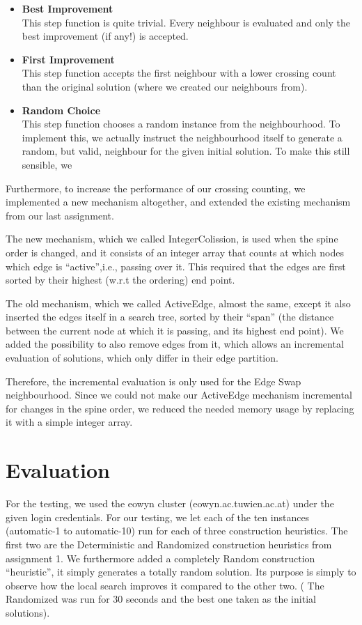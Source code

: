 \documentclass [11pt]{article}
\begin{document}
\begin{itemize}
  \item \textbf{ Best Improvement} \\
  This step function is quite trivial. Every neighbour is evaluated and only the best improvement (if any!) is accepted. 
  \item \textbf{ First Improvement} \\
  This step function accepts the first neighbour with a lower crossing count than the original solution (where we created our neighbours from).
   \item \textbf{ Random Choice} \\
  This step function chooses a random instance from the neighbourhood. To implement this, we actually instruct the neighbourhood itself to generate a random, but valid, neighbour for the given initial solution. To make this still sensible, we 
\end{itemize}



Furthermore, to increase the performance of our crossing counting, we implemented a new mechanism altogether, and extended the existing mechanism from our last assignment. 

The new mechanism, which we called IntegerColission, is used when the spine order is changed, and it consists of an integer array that counts at which nodes which edge is ``active'',i.e., passing over it. This required that the edges are first sorted by their highest (w.r.t the ordering) end point. 

The old mechanism, which we called ActiveEdge, almost the same, except it also inserted the edges itself in a search tree, sorted by their ``span'' (the distance between the current node at which it is passing, and its highest end point). We added the possibility to also remove edges from it, which allows an incremental evaluation of solutions, which only differ in their edge partition. 

Therefore, the incremental evaluation is only used for the Edge Swap neighbourhood. Since we could not make our ActiveEdge mechanism incremental for changes in the spine order, we reduced the needed memory usage by replacing it with a simple integer array.


\section{Evaluation}
For the testing, we used the eowyn cluster (eowyn.ac.tuwien.ac.at) under the given login credentials. For our testing, we let each of the ten instances (automatic-1 to automatic-10) run for each of three construction heuristics. The first two are the Deterministic and Randomized construction heuristics from assignment 1. We furthermore added a completely Random construction ``heuristic'', it simply generates a totally random solution. Its purpose is simply to observe how the local search improves it compared to the other two. ( The Randomized was run for 30 seconds and the best one taken as the initial solutions). 
\end{document}
